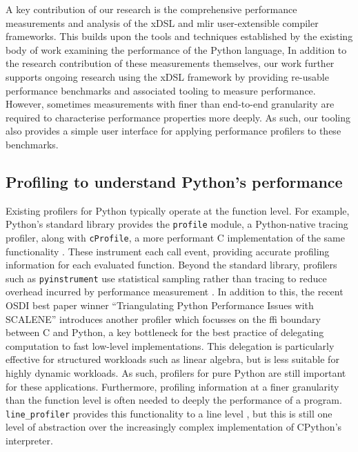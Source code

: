 A key contribution of our research is the comprehensive performance measurements and analysis of the xDSL and \ac{mlir} user-extensible compiler frameworks.
This builds upon the tools and techniques established by the existing body of work examining the performance of the Python language,
In addition to the research contribution of these measurements themselves, our work further supports ongoing research using the xDSL framework by providing re-usable performance benchmarks and associated tooling to measure performance.
However, sometimes measurements with finer than end-to-end granularity are required to characterise performance properties more deeply. As such, our tooling also provides a simple user interface for applying performance profilers to these benchmarks.


\subsection{Profiling to understand Python's performance}
\label{sec:python-performance-profiling}

Existing profilers for Python typically operate at the function level.
For example, Python's standard library provides the \texttt{profile} module, a Python-native tracing profiler, along with \texttt{cProfile}, a more performant C implementation of the same functionality \cite{pythonsoftwarefoundationPythonProfilers}. These instrument each call event, providing accurate profiling information for each evaluated function.
Beyond the standard library, profilers such as \texttt{pyinstrument} use statistical sampling rather than tracing to reduce overhead incurred by performance measurement \cite{rickerbyPyinstrument2025}.
In addition to this, the recent OSDI best paper winner ``Triangulating Python Performance Issues with SCALENE'' \cite{bergerTriangulatingPythonPerformance2023a} introduces another profiler which focusses on the \ac{ffi} boundary between C and Python, a key bottleneck for the best practice of delegating computation to fast low-level implementations.
This delegation is particularly effective for structured workloads such as linear algebra, but is less suitable for highly dynamic workloads.
As such, profilers for pure Python are still important for these applications.
Furthermore, profiling information at a finer granularity than the function level is often needed to deeply the performance of a program.
\texttt{line\_profiler} provides this functionality to a line level \cite{robertkernPyutilsLine_profiler2025}, but this is still one level of abstraction over the increasingly complex implementation of CPython's interpreter.


